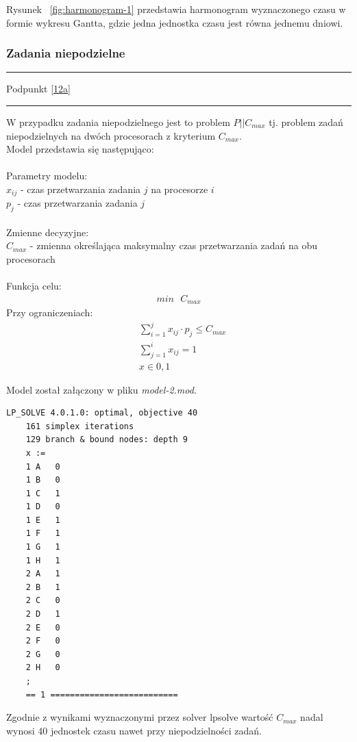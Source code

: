 \documentclass[
    12pt, %
]{../fphw}
\begin{document}
Rysunek ~\ref{fig:harmonogram-1} przedstawia harmonogram wyznaczonego czasu
w formie wykresu Gantta, gdzie jedna jednostka czasu jest równa jednemu dniowi.

\subsubsection{Zadania niepodzielne}
\par\noindent\rule{\textwidth}{0.4pt}
Podpunkt \ref{12a}
\par\noindent\rule{\textwidth}{0.4pt}
W przypadku zadania niepodzielnego jest to problem \(P||C_{max}\)
tj. problem zadań niepodzielnych na dwóch procesorach z kryterium \(C_{max}\). \\
Model przedstawia się następująco: \\ \\
Parametry modelu: \\
\(x_{ij}\) - czas przetwarzania zadania \(j\) na procesorze \(i\) \\
\(p_j\) - czas przetwarzania zadania \(j\) \\ \\
Zmienne decyzyjne: \\
\(C_{max}\) - zmienna określająca maksymalny czas przetwarzania zadań na obu procesorach \\ \\
Funkcja celu: \\
\begin{align*}
    min \text{ } C_{max}
\end{align*}
\newpage
Przy ograniczeniach: \\
\begin{align*}
     & \sum^j_{i=1}x_{ij} \cdot p_j \leq C_{max} \\
     & \sum^i_{j=1}x_{ij} = 1                    \\
     & x \in  {0,1}
\end{align*}


Model został załączony w pliku \textit{model-2.mod}.

\begin{lstlisting}[caption=Rozwiązanie znalezione solwerem lpsolve]
    LP_SOLVE 4.0.1.0: optimal, objective 40
    161 simplex iterations
    129 branch & bound nodes: depth 9
    x :=
    1 A   0
    1 B   0
    1 C   1
    1 D   0
    1 E   1
    1 F   1
    1 G   1
    1 H   1
    2 A   1
    2 B   1
    2 C   0
    2 D   1
    2 E   0
    2 F   0
    2 G   0
    2 H   0
    ;
    == 1 ==========================
\end{lstlisting}
Zgodnie z wynikami wyznaczonymi przez solver lpsolve wartość \(C_{max}\) nadal wynosi 40 jednostek czasu
nawet przy niepodzielności zadań.
\end{document}
